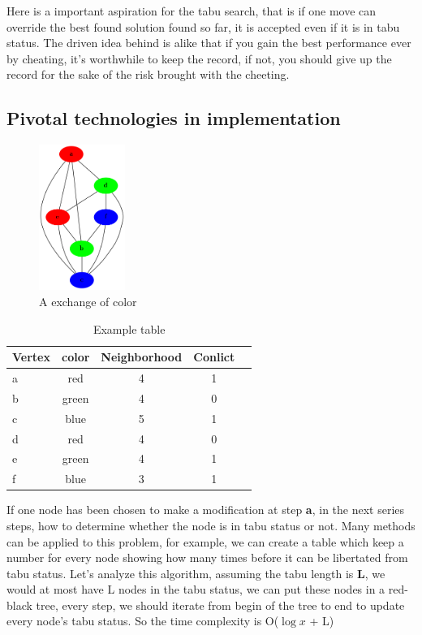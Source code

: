 \documentclass[10pt, a4paper, twocolumn]{article} %
\begin{document}
Here is a important aspiration for the tabu search, that is if one move can
override the best found solution found so far, it is accepted even if it is in
tabu status. The driven idea behind is alike that if you gain the best
performance ever by cheating, it's worthwhile to keep the record, if not, you
should give up the record for the sake of the risk brought with the cheeting.



\subsection{Pivotal technologies in implementation}
\begin{figure}[h]
    \centering
    \includegraphics[width=0.25\textwidth]{tabutwo.png}
    \caption{A exchange of color}
    \label{tabutwo}
\end{figure}

\begin{table}
	\caption{Example table}
	\centering
    \label{tabutabletwo}
    \begin{tabular}{l*{3}{c}r}
        Vertex & color & Neighborhood & Conlict \\
    \hline
    a & red     &4 & 1   \\
    b & green   &4 & 0   \\
    c & blue    &5 & 1   \\
    d & red     &4 & 0   \\
    e & green   &4 & 1   \\
    f & blue    &3 & 1   \\
    \end{tabular}
\end{table}
If one node has been chosen to make a modification at step \textbf{a}, in the
next series steps, how to determine whether the node is in tabu status or not.
Many methods can be applied to this problem, for example, we can create a table
which keep a number for every node showing how many times before it can be
libertated from tabu status. Let's analyze this algorithm, assuming the tabu
length is \textbf{L}, we would at most have L nodes in the tabu status, we can
put these nodes in a red-black tree, every step, we should iterate from begin of
the tree to end to update every node's tabu status. So the time complexity is
O(\(\log{x}\) + L)
\end{document}
